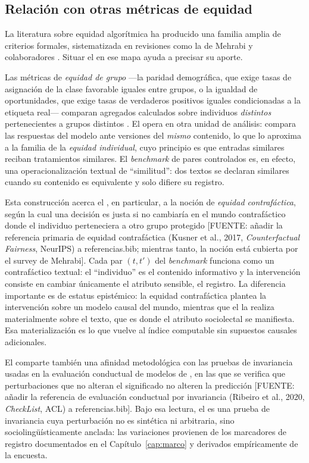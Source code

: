 \subsection{Relación con otras métricas de equidad}

La literatura sobre equidad algorítmica ha producido una familia amplia de
criterios formales, sistematizada en revisiones como la de Mehrabi y
colaboradores \cite{Mehrabi2021Survey}. Situar el \INS en ese mapa ayuda a
precisar su aporte.

Las métricas de \emph{equidad de grupo} ---la paridad demográfica, que exige
tasas de asignación de la clase favorable iguales entre grupos, o la igualdad
de oportunidades, que exige tasas de verdaderos positivos iguales
condicionadas a la etiqueta real--- comparan agregados calculados sobre
individuos \emph{distintos} pertenecientes a grupos distintos
\cite{Mehrabi2021Survey}. El \INS opera en otra unidad de análisis: compara
las respuestas del modelo ante versiones del \emph{mismo} contenido, lo que
lo aproxima a la familia de la \emph{equidad individual}, cuyo principio es
que entradas similares reciban tratamientos similares. El \emph{benchmark} de
pares controlados es, en efecto, una operacionalización textual de
``similitud'': dos textos se declaran similares cuando su contenido es
equivalente y solo difiere su registro.

Esta construcción acerca el \INS, en particular, a la noción de
\emph{equidad contrafáctica}, según la cual una decisión es justa si no
cambiaría en el mundo contrafáctico donde el individuo perteneciera a otro
grupo protegido [FUENTE: añadir la referencia primaria de equidad
contrafáctica (Kusner et al., 2017, \emph{Counterfactual Fairness}, NeurIPS)
a referencias.bib; mientras tanto, la noción está cubierta por el survey de
Mehrabi]. Cada par $(t, t')$ del \emph{benchmark} funciona como un
contrafáctico textual: el ``individuo'' es el contenido informativo y la
intervención consiste en cambiar únicamente el atributo sensible, el
registro. La diferencia importante es de estatus epistémico: la equidad
contrafáctica plantea la intervención sobre un modelo causal del mundo,
mientras que el \INS la realiza materialmente sobre el texto, que es donde el
atributo sociolectal se manifiesta. Esa materialización es lo que vuelve al
índice computable sin supuestos causales adicionales.

El \INS comparte también una afinidad metodológica con las pruebas de
invariancia usadas en la evaluación conductual de modelos de \PLN, en las que
se verifica que perturbaciones que no alteran el significado no alteren la
predicción [FUENTE: añadir la referencia de evaluación conductual por
invariancia (Ribeiro et al., 2020, \emph{CheckList}, ACL) a
referencias.bib]. Bajo esa lectura, el \INS es una prueba de invariancia cuya
perturbación no es sintética ni arbitraria, sino sociolingüísticamente
anclada: las variaciones provienen de los marcadores de registro
documentados en el Capítulo~\ref{cap:marco} y derivados empíricamente de la
encuesta.

